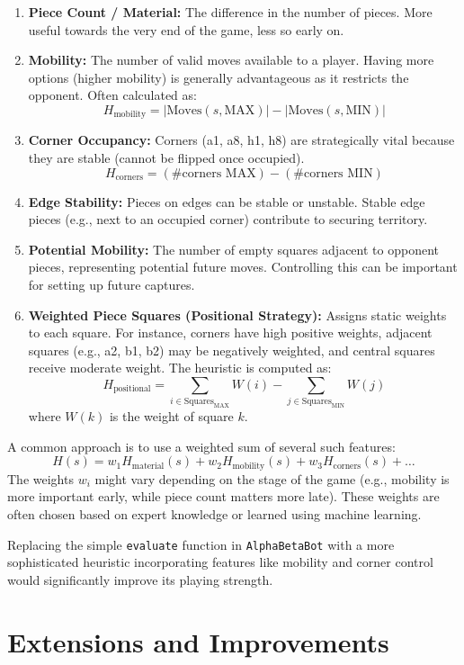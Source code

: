\documentclass[11pt]{article}
\begin{document}
\begin{enumerate}
    \item \textbf{Piece Count / Material:} The difference in the number of pieces. More useful towards the very end of the game, less so early on.
    \item \textbf{Mobility:} The number of valid moves available to a player. Having more options (higher mobility) is generally advantageous as it restricts the opponent. Often calculated as:
    \[ H_{\text{mobility}} = |\text{Moves}(s, \text{MAX})| - |\text{Moves}(s, \text{MIN})| \]
    \item \textbf{Corner Occupancy:} Corners (a1, a8, h1, h8) are strategically vital because they are stable (cannot be flipped once occupied).
    \[ H_{\text{corners}} = (\# \text{corners MAX}) - (\# \text{corners MIN}) \]
    \item \textbf{Edge Stability:} Pieces on edges can be stable or unstable. Stable edge pieces (e.g., next to an occupied corner) contribute to securing territory.
    \item \textbf{Potential Mobility:} The number of empty squares adjacent to opponent pieces, representing potential future moves. Controlling this can be important for setting up future captures.
    \item \textbf{Weighted Piece Squares (Positional Strategy):} Assigns static weights to each square. For instance, corners have high positive weights, adjacent squares (e.g., a2, b1, b2) may be negatively weighted, and central squares receive moderate weight. The heuristic is computed as:
    \[ H_{\text{positional}} = \sum_{i \in \text{Squares}_{\text{MAX}}} W(i) - \sum_{j \in \text{Squares}_{\text{MIN}}} W(j) \]
    where $W(k)$ is the weight of square $k$.
\end{enumerate}

A common approach is to use a weighted sum of several such features:
\[ H(s) = w_1 H_{\text{material}}(s) + w_2 H_{\text{mobility}}(s) + w_3 H_{\text{corners}}(s) + \dots \]
The weights $w_i$ might vary depending on the stage of the game (e.g., mobility is more important early, while piece count matters more late). These weights are often chosen based on expert knowledge or learned using machine learning.

Replacing the simple \texttt{evaluate} function in \texttt{AlphaBetaBot} with a more sophisticated heuristic incorporating features like mobility and corner control would significantly improve its playing strength.

\section{Extensions and Improvements}
\end{document}
